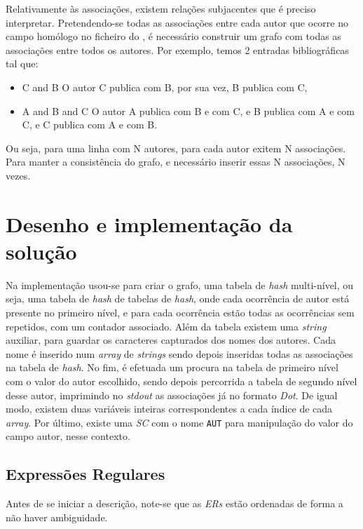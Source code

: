 Relativamente às associações, existem relações subjacentes que
é preciso interpretar. Pretendendo-se todas as associações entre cada autor que
ocorre no campo homólogo no ficheiro do , é necessário
construir um grafo com todas as associações entre todos os autores.
Por exemplo, temos 2 entradas bibliográficas tal que: 

\begin{itemize}
	\item C and B 
O autor C publica com B, por sua vez, B publica com C,
	\item A and B and C
O autor A publica com B e com C, e B publica com A e com C,
e C publica com A e com B.
\end{itemize}

Ou seja, para uma linha com N autores, para cada autor
exitem N associações. Para manter a consistência do grafo, e necessário inserir
essas N associações, N vezes.



\section{Desenho e implementação da solução}
\label{sec:des:c}
Na implementação usou-se para criar o grafo, uma tabela de \emph{hash}
multi-nível, ou seja, uma tabela de \emph{hash} de tabelas de \emph{hash}, onde
cada ocorrência de autor está presente no primeiro nível, e para cada ocorrência
estão todas as ocorrências sem repetidos, com um contador associado. Além da
tabela existem uma \emph{string} auxiliar, para guardar os caracteres capturados
dos nomes dos autores. Cada nome é inserido num \emph{array} de \emph{strings}
sendo depois inseridas todas as associações na tabela de \emph{hash}. No fim,
é efetuada um procura na tabela de primeiro nível com o valor do autor
escolhido, sendo depois percorrida a tabela de segundo nível desse autor,
imprimindo no \emph{stdout} as associações já no formato \emph{Dot}. De igual
modo, existem duas variáveis inteiras correspondentes a cada índice de cada
\emph{array}. Por último, existe uma \emph{SC} com o nome \texttt{AUT} para
manipulação do valor do campo autor, nesse contexto.  



\subsection{Expressões Regulares}
Antes de se iniciar a descrição, note-se que as \emph{ERs} estão ordenadas de
forma a não haver ambiguidade.


